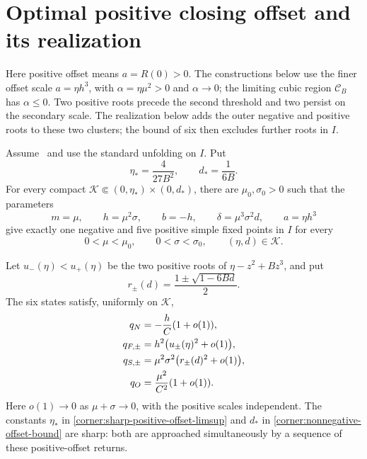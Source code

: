 \section{Optimal positive closing offset and its realization}\label{sup:positive}

Here positive offset means $a=R(0)>0$.
The constructions below use the finer offset scale $a=\eta h^3$, with
$\alpha=\eta\mu^2>0$ and $\alpha\to0$; the limiting cubic region
$\mathcal C_B$ has $\alpha\le0$.
Two positive roots precede the second threshold and two persist on the
secondary scale.
The realization below adds the outer negative and positive roots to these
two clusters; the bound of six then excludes further roots in $I$.

\begin{proposition}
\label{corner:positive-offset-realization}
\label{thm:positive-offset-six}
Assume~\cite[(\ref*{main-eq:rank})]{main2026} and use the standard
unfolding on $I$.
Put
\[
 \eta_*=\frac{4}{27B^2},\qquad d_*=\frac{1}{6B}.
\]
For every compact
$\mathcal K\Subset(0,\eta_*)\times(0,d_*)$, there are
$\mu_0,\sigma_0>0$ such that the parameters
\begin{equation}\label{corner:positive-offset-weights}
 m=\mu,\qquad h=\mu^2\sigma,\qquad b=-h,\qquad
 \delta=\mu^3\sigma^2d,\qquad a=\eta h^3
\end{equation}
give exactly one negative and five positive simple fixed points in $I$
for every
\[
 0<\mu<\mu_0,\qquad0<\sigma<\sigma_0,\qquad
 (\eta,d)\in\mathcal K.
\]

Let $u_-(\eta)<u_+(\eta)$ be the two positive roots of
$\eta-z^2+Bz^3$, and put
\[
 r_\pm(d)=\frac{1\pm\sqrt{1-6Bd}}2.
\]
The six states satisfy, uniformly on $\mathcal K$,
\begin{align}
 q_N&=-\frac hC(1+o(1)),\notag\\
 q_{F,\pm}&=h^2\bigl(u_\pm(\eta)^2+o(1)\bigr),\notag\\
 q_{S,\pm}&=\mu^2\sigma^2\bigl(r_\pm(d)^2+o(1)\bigr),\notag\\
 q_O&=\frac{\mu^2}{C^2}(1+o(1)).
                                  \label{corner:positive-offset-roots}
\end{align}
Here $o(1)\to0$ as $\mu+\sigma\to0$, with the positive scales
independent. The constants $\eta_*$ in
\eqref{corner:sharp-positive-offset-limsup} and $d_*$ in
\eqref{corner:nonnegative-offset-bound} are sharp: both are approached
simultaneously by a sequence of these positive-offset returns.
\end{proposition}

